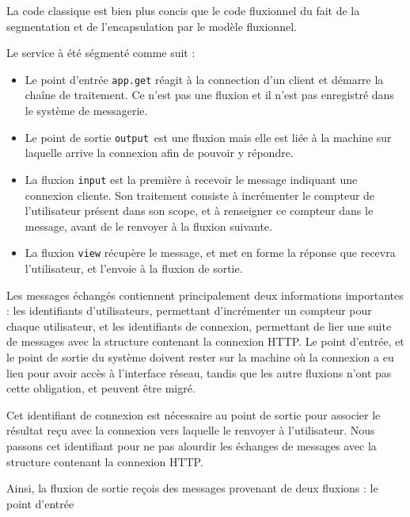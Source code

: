 La code classique est bien plus concis que le code fluxionnel du fait de la segmentation et de l'encapsulation  par le modèle fluxionnel.

Le service à été ségmenté comme suit :
\begin{itemize}
  \item Le point d'entrée \texttt{app.get} réagit à la connection d'un client et démarre la chaîne de traitement.
  Ce n'est pas une fluxion et il n'est pas enregistré dans le système de messagerie.
  \item Le point de sortie \texttt{output} est une fluxion mais elle est liée à la machine sur laquelle arrive la connexion afin de pouvoir y répondre.
  \item La fluxion \texttt{input} est la première à recevoir le message indiquant une connexion cliente. Son traitement consiste à incrémenter le compteur de l'utilisateur présent dans son scope, et à renseigner ce compteur dans le message, avant de le renvoyer à la fluxion suivante.
  \item La fluxion \texttt{view} récupère le message, et met en forme la réponse que recevra l'utilisateur, et l'envoie à la fluxion de sortie.
\end{itemize}

Les messages échangés contiennent principalement deux informations importantes : les identifiants d'utilisateurs, permettant d'incrémenter un compteur pour chaque utilisateur, et les identifiants de connexion, permettant de lier une suite de messages avec la structure contenant la connexion HTTP.
Le point d'entrée, et le point de sortie du système doivent rester sur la machine où la connexion a eu lieu pour avoir accès à l'interface réseau, tandis que les autre fluxions n'ont pas cette obligation, et peuvent être migré.


Cet identifiant de connexion est nécessaire au point de sortie pour associer le résultat reçu avec la connexion vers laquelle le renvoyer à l'utilisateur.
Nous passons cet identifiant pour ne pas alourdir les échanges de messages avec la structure contenant la connexion HTTP.

Ainsi, la fluxion de sortie reçois des messages provenant de deux fluxions : le point d'entrée




